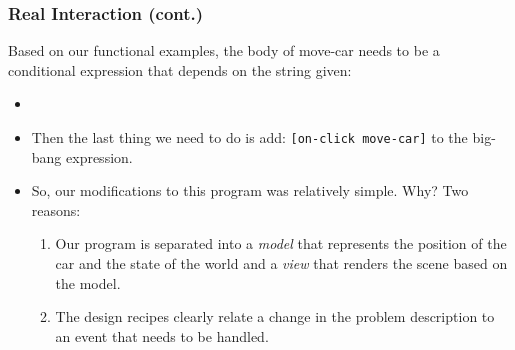 \documentclass{beamer}
\begin{document}

\begin{frame}
  \frametitle{Real Interaction (cont.)}
  Based on our functional examples, the body of move-car needs to be a
  conditional expression that depends on the string given:
  \begin{itemize}
  \item<2-> \moveCar
  \item<3-> Then the last thing we need to do is add:
    \texttt{[on-click move-car]} to the big-bang expression.
  \item<4-> So, our modifications to this program was relatively simple. Why?
    Two reasons:
    \begin{enumerate}
    \item<5-> Our program is separated into a \emph{model} that represents
      the position of the car and the state of the world and a \emph{view}
      that renders the scene based on the model.
    \item<6-> The design recipes clearly relate a change in the problem description
      to an event that needs to be handled.
    \end{enumerate}
  \end{itemize}
\end{frame}
\end{document}
